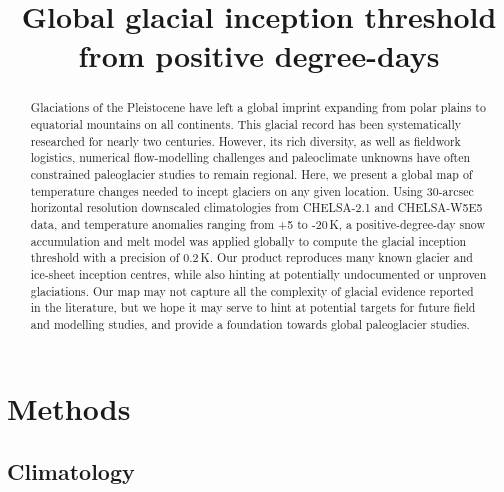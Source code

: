 \documentclass[manuscript]{copernicus}
\title{Global glacial inception threshold from positive degree-days}
\affil[1]{Department of Water and Climate, Vrije Universiteit Brussel, Brussels, Belgium}
\begin{document}

\maketitle

\begin{abstract}

    Glaciations of the Pleistocene have left a global imprint expanding from
    polar plains to equatorial mountains on all continents. This glacial record
    has been systematically researched for nearly two centuries. However, its
    rich diversity, as well as fieldwork logistics, numerical flow-modelling
    challenges and paleoclimate unknowns have often constrained paleoglacier
    studies to remain regional.
    Here, we present a global map of temperature changes needed to incept
    glaciers on any given location. Using 30-arcsec horizontal resolution
    downscaled climatologies from CHELSA-2.1 and CHELSA-W5E5 data, and
    temperature anomalies ranging from +5 to -20\,K, a positive-degree-day snow
    accumulation and melt model was applied globally to compute the glacial
    inception threshold with a precision of 0.2\,K.
    Our product reproduces many known glacier and ice-sheet inception centres,
    while also hinting at potentially undocumented or unproven glaciations.
    Our map may not capture all the complexity of glacial evidence reported in
    the literature, but we hope it may serve to hint at potential targets for
    future field and modelling studies, and provide a foundation towards global
    paleoglacier studies.

\end{abstract}


\introduction

\section{Methods}

\subsection{Climatology}
\end{document}
